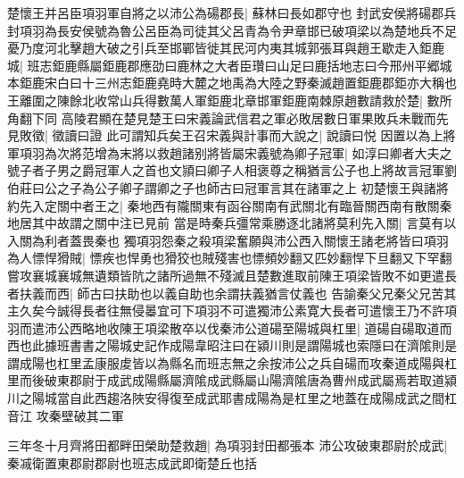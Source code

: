 楚懷王并呂臣項羽軍自將之以沛公為碭郡長|{
	蘇林曰長如郡守也}
封武安侯將碭郡兵封項羽為長安侯號為魯公呂臣為司徒其父呂青為令尹章邯已破項梁以為楚地兵不足憂乃度河北擊趙大破之引兵至邯鄲皆徙其民河内夷其城郭張耳與趙王歇走入鉅鹿城|{
	班志鉅鹿縣屬鉅鹿郡應劭曰鹿林之大者臣瓚曰山足曰鹿括地志曰今邢州平郷城本鉅鹿宋白曰十三州志鉅鹿堯時大麓之地禹為大陸之野秦滅趙置鉅鹿郡鉅亦大稱也}
王離圍之陳餘北收常山兵得數萬人軍鉅鹿北章邯軍鉅鹿南棘原趙數請救於楚|{
	數所角翻下同}
高陵君顯在楚見楚王曰宋義論武信君之軍必敗居數日軍果敗兵未戰而先見敗徵|{
	徵讀曰證}
此可謂知兵矣王召宋義與計事而大說之|{
	說讀曰悦}
因置以為上將軍項羽為次將范增為末將以救趙諸别將皆屬宋義號為卿子冠軍|{
	如淳曰卿者大夫之號子者子男之爵冠軍人之首也文頴曰卿子人相褒尊之稱猶言公子也上將故言冠軍劉伯莊曰公之子為公子卿子謂卿之子也師古曰冠軍言其在諸軍之上}
初楚懷王與諸將約先入定關中者王之|{
	秦地西有隴關東有函谷關南有武關北有臨晉關西南有散關秦地居其中故謂之關中注已見前}
當是時秦兵彊常乘勝逐北諸將莫利先入關|{
	言莫有以入關為利者蓋畏秦也}
獨項羽怨秦之殺項梁奮願與沛公西入關懷王諸老將皆曰項羽為人慓悍猾賊|{
	慓疾也悍勇也猾狡也賊殘害也慓頻妙翻又匹妙翻悍下旦翻又下罕翻}
嘗攻襄城襄城無遺類皆阬之諸所過無不殘滅且楚數進取前陳王項梁皆敗不如更遣長者扶義而西|{
	師古曰扶助也以義自助也余謂扶義猶言仗義也}
告諭秦父兄秦父兄苦其主久矣今誠得長者往無侵㬥宜可下項羽不可遣獨沛公素寛大長者可遣懷王乃不許項羽而遣沛公西略地收陳王項梁散卒以伐秦沛公道碭至陽城與杠里|{
	道碭自碭取道而西也此據班書書之陽城史記作成陽韋昭注曰在潁川則是謂陽城也索隱曰在濟隂則是謂成陽也杠里孟康服䖍皆以為縣名而班志無之余按沛公之兵自碭而攻秦道成陽與杠里而後破東郡尉于成武成陽縣屬濟隂成武縣屬山陽濟隂唐為曹州成武屬焉若取道潁川之陽城當自此西趨洛陜安得復至成武耶書成陽為是杠里之地蓋在成陽成武之間杠音江}
攻秦壁破其二軍

三年冬十月齊將田都畔田榮助楚救趙|{
	為項羽封田都張本}
沛公攻破東郡尉於成武|{
	秦㓕衛置東郡尉郡尉也班志成武即衛楚丘也括}


